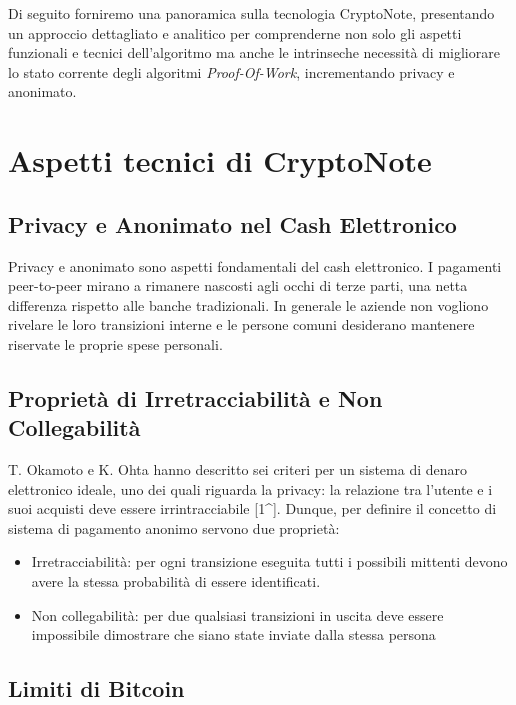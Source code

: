 \documentclass[
]{article}
\providecommand{\tightlist}{%
  \setlength{\itemsep}{0pt}\setlength{\parskip}{0pt}}
\begin{document}
Di seguito forniremo una panoramica sulla tecnologia CryptoNote,
presentando un approccio dettagliato e analitico per comprenderne non
solo gli aspetti funzionali e tecnici dell'algoritmo ma anche le
intrinseche necessità di migliorare lo stato corrente degli algoritmi
\emph{Proof-Of-Work}, incrementando privacy e anonimato.

\section{Aspetti tecnici di
CryptoNote}\label{aspetti-tecnici-di-cryptonote}

\subsection{Privacy e Anonimato nel Cash
Elettronico}\label{privacy-e-anonimato-nel-cash-elettronico}

Privacy e anonimato sono aspetti fondamentali del cash elettronico. I
pagamenti peer-to-peer mirano a rimanere nascosti agli occhi di terze
parti, una netta differenza rispetto alle banche tradizionali. In
generale le aziende non vogliono rivelare le loro transizioni interne e
le persone comuni desiderano mantenere riservate le proprie spese
personali.

\subsection{Proprietà di Irretracciabilità e Non
Collegabilità}\label{proprietuxe0-di-irretracciabilituxe0-e-non-collegabilituxe0}

T. Okamoto e K. Ohta hanno descritto sei criteri per un sistema di
denaro elettronico ideale, uno dei quali riguarda la privacy: la
relazione tra l'utente e i suoi acquisti deve essere irrintracciabile
{[}1\^{}{]}. Dunque, per definire il concetto di sistema di pagamento
anonimo servono due proprietà:

\begin{itemize}
\tightlist
\item
  Irretracciabilità: per ogni transizione eseguita tutti i possibili
  mittenti devono avere la stessa probabilità di essere identificati.
\item
  Non collegabilità: per due qualsiasi transizioni in uscita deve essere
  impossibile dimostrare che siano state inviate dalla stessa persona
\end{itemize}

\subsection{Limiti di Bitcoin}\label{limiti-di-bitcoin}
\end{document}
